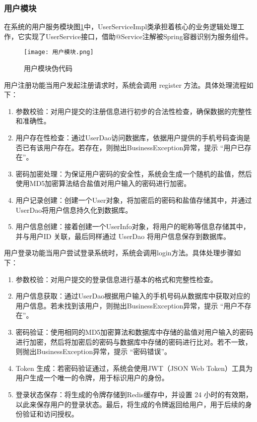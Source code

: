 \subsubsection{用户模块}

在系统的用户服务模块图\ref{用户模块伪代码}中，UserServiceImpl类承担着核心的业务逻辑处理工作，它实现了UserService接口，借助@Service注解被Spring容器识别为服务组件。

\begin{figure}[hbt]
    \centering
    \texttt{[image: 用户模块.png]}
    \caption{用户模块伪代码}
    \label{用户模块伪代码}
\end{figure}


用户注册功能当用户发起注册请求时，系统会调用 register 方法。具体处理流程如下：
\begin{enumerate}[label=(\arabic*)]
    \item 参数校验：对用户提交的注册信息进行初步的合法性检查，确保数据的完整性和准确性。
    \item 用户存在性检查：通过UserDao访问数据库，依据用户提供的手机号码查询是否已有该用户存在。若存在，则抛出BusinessException异常，提示 “用户已存在”。
    \item 密码加密处理：为保证用户密码的安全性，系统会生成一个随机的盐值，然后使用MD5加密算法结合盐值对用户输入的密码进行加密。
    \item 用户记录创建：创建一个User对象，将加密后的密码和盐值存储其中，并通过UserDao将用户信息持久化到数据库。
    \item 用户信息创建：接着创建一个UserInfo对象，将用户的昵称等信息存储其中，并与用户ID 关联，最后同样通过 UserDao 将用户信息保存到数据库。

\end{enumerate}

用户登录功能当用户尝试登录系统时，系统会调用login方法。具体处理步骤如下：
\begin{enumerate}[label=(\arabic*)]
    \item 参数校验：对用户提交的登录信息进行基本的格式和完整性检查。
    \item 用户信息获取：通过UserDao根据用户输入的手机号码从数据库中获取对应的用户信息。若未找到该用户，则抛出BusinessException异常，提示 “用户不存在”。
    \item 密码验证：使用相同的MD5加密算法和数据库中存储的盐值对用户输入的密码进行加密，然后将加密后的密码与数据库中存储的密码进行比对。若不一致，则抛出BusinessException异常，提示 “密码错误”。
    \item Token 生成：若密码验证通过，系统会使用JWT（JSON Web Token）工具为用户生成一个唯一的令牌，用于标识用户的身份。
    \item 登录状态保存：将生成的令牌存储到Redis缓存中，并设置 24 小时的有效期，以此来保存用户的登录状态。最后，将生成的令牌返回给用户，用于后续的身份验证和访问授权。

\end{enumerate}


